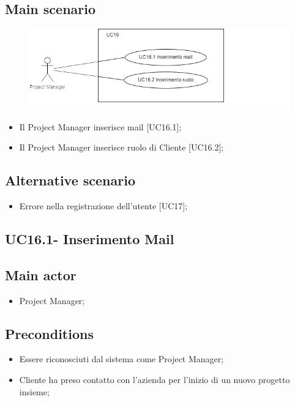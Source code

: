 \documentclass{article}
\begin{document}
    \subsection*{Main scenario}
        \begin{figure}[h]
          \centering
          \includegraphics{./imgUML/UC16-zoom.png}
          \label{fig:immagine}
        \end{figure}
        
        \begin{itemize}
            \item Il Project Manager inserisce mail [UC16.1];
            \item Il Project Manager inserisce ruolo di Cliente [UC16.2];
        \end{itemize}
        
    \subsection*{Alternative scenario}
        \begin{itemize}
            \item Errore nella registrazione dell'utente [UC17];
        \end{itemize}

    \subsection{UC16.1- Inserimento Mail}
    \subsection*{Main actor}
        \begin{itemize}
            \item Project Manager;
        \end{itemize}
        
    \subsection*{Preconditions}
        \begin{itemize}
            \item Essere riconosciuti dal sistema come Project Manager;
            \item Cliente ha preso contatto con l'azienda per l'inizio di un nuovo progetto insieme;
        \end{itemize}
        
\end{document}
